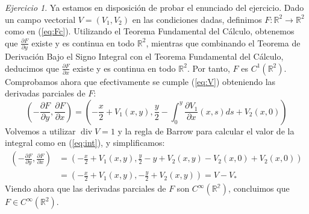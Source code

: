\documentclass[12pt,spanish]{article}
\theoremstyle{definition}
\theoremstyle{remark}
\newtheorem{exercise}{Ejercicio}
\begin{document}
\begin{exercise}
Ya estamos en disposición de probar el enunciado del ejercicio. Dado
un campo vectorial $V=(V_1,V_2)$ en las condiciones dadas, definimos
$F:\mathbb{R}^2\rightarrow\mathbb{R}^2$ como en
(\ref{eq:Fc}). Utilizando el Teorema Fundamental del Cálculo,
obtenemos que $\frac{\partial F}{\partial y}$ existe y es continua en
todo $\mathbb{R}^2$, mientras que combinando el Teorema de Derivación
Bajo el Signo Integral con el Teorema Fundamental del Cálculo,
deducimos que $\frac{\partial F}{\partial x}$ existe y es continua en
todo $\mathbb{R}^2$. Por tanto, $F$ es
$C^1(\mathbb{R}^2)$. Comprobamos ahora que efectivamente se cumple
(\ref{eq:V}) obteniendo las derivadas parciales de $F$:
\begin{equation*}
  \left(-\frac{\partial F}{\partial y},\frac{\partial F}{\partial x}\right)=\left(-\frac{x}{2}+V_1(x,y),\frac{y}{2}-\int_0^y \frac{\partial V_1}{\partial x}(x,s)ds+V_2(x,0)\right)
\end{equation*}
Volvemos a utilizar $\operatorname{div}V=1$ y la regla de Barrow para
calcular el valor de la integral como en (\ref{eq:int}), y
simplificamos:
\begin{align*}
  \left(-\frac{\partial F}{\partial y},\frac{\partial F}{\partial x}\right)&=\left(-\frac{x}{2}+V_1(x,y),\frac{y}{2}-y+V_2(x,y)-V_2(x,0)+V_2(x,0)\right) \\
  &=\left(-\frac{x}{2}+V_1(x,y),-\frac{y}{2}+V_2(x,y)\right)=V-V_*
\end{align*}
Viendo ahora que las derivadas parciales de $F$ son
$C^\infty(\mathbb{R^2})$, concluimos que $F\in C^\infty(\mathbb{R}^2)$.
\end{exercise}
\end{document}
